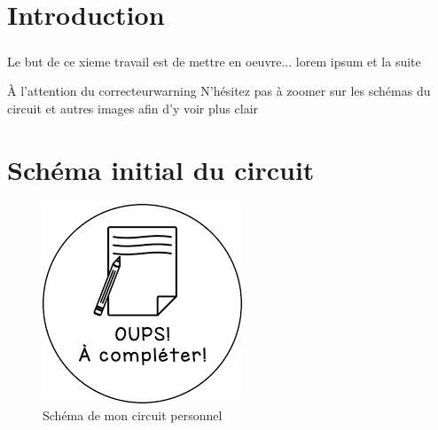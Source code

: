 \section{Introduction}

    \subparagraph{}Le but de ce xieme travail est de mettre en oeuvre... lorem ipsum et la suite \\[1.5cm]
    
    \begin{titletbox}{À l'attention du correcteur}{warning}
        N'hésitez pas à zoomer sur les schémas du circuit et autres images afin d'y voir plus clair
    \end{titletbox}

\section{Schéma initial du circuit}

    \begin{figure}[H]
        \centering
        \includegraphics[scale=0.5]{../pictures/blank.png} %
        \caption{Schéma de mon circuit personnel}
    \end{figure}

